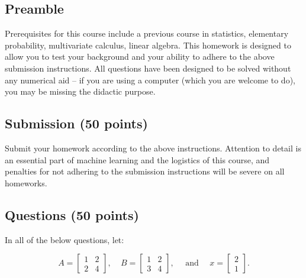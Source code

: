 \documentclass[]{../util/ColumbiaAssm}
\begin{document}
% 

\vspace{-2cm}

\AddSubmissionRules

  

\subsection*{Preamble}

Prerequisites for this course include a previous course in statistics, elementary probability, multivariate calculus, linear algebra.  This homework is designed to allow you to test your background and your ability to adhere to the above submission instructions. All questions have been designed to be solved without any numerical aid -- if you are using a computer (which you are welcome to do), you may be missing the didactic purpose.   


\subsection*{Submission (50 points)}  Submit your homework according to the above instructions.  Attention to detail is an essential part of machine learning and the logistics of this course, and penalties for not adhering to the submission instructions will be severe on all homeworks.

\subsection*{Questions (50 points)}

In all of the below questions, let:

\begin{equation}
A = \begin{bmatrix}  1 & 2 \\ 2 & 4 \end{bmatrix}, ~~~~~ B =   \begin{bmatrix}  1 & 2 \\ 3 & 4 \end{bmatrix}, ~~~~~~\textrm{and}~~~~~~ x = \begin{bmatrix}  2 \\ 1 \end{bmatrix}. \nonumber
\end{equation}
\end{document}

